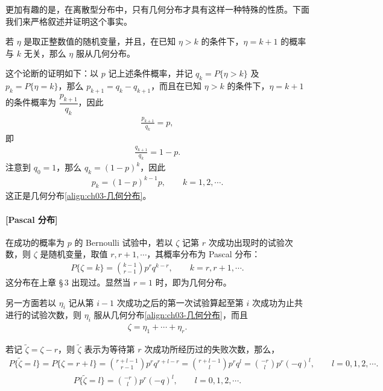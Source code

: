 \documentclass[../../main.tex]{subfiles}
\begin{document}
更加有趣的是，在离散型分布中，只有几何分布才具有这样一种特殊的性质。下面我们来严格叙述并证明这个事实。

若 $\eta$ 是取正整数值的随机变量，并且，在已知 $\eta>k$ 的条件下，$\eta=k+1$ 的概率与 $k$ 无关，那么 $\eta$ 服从几何分布。

这个论断的证明如下：以 $p$ 记上述条件概率，并记 $q_k=P\{\eta>k\}$ 及 $p_k=P\{\eta=k\}$，那么 $p_{k+1}=q_k-q_{k+1}$，而且在已知 $\eta>k$ 的条件下，$\eta=k+1$ 的条件概率为 $\dfrac{p_{k+1}}{q_k}$，因此
\begin{align*}\frac{p_{k+1}}{q_k}=p,\end{align*}
即
\begin{align*}\frac{q_{k+1}}{q_k}=1-p.\end{align*}
注意到 $q_0=1$，那么 $q_k=(1-p)^{k}$，因此
\begin{align*}p_k=(1-p)^{k-1}p,\qquad k=1,2,\cdots.\end{align*}
这正是几何分布\eqref{align:ch03-几何分布}。

\paragraph{[Pascal 分布]}在成功的概率为 $p$ 的 Bernoulli 试验中，若以 $\zeta$ 记第 $r$ 次成功出现时的试验次数，则 $\zeta$ 是随机变量，取值 $r,r+1,\cdots$，其概率分布为 Pascal 分布：
\begin{align}
P\{\zeta=k\}=\binom{k-1}{r-1}p^{r}q^{k-r},\qquad k=r,r+1,\cdots.\label{align:ch03-pascal分布}
\end{align}
这分布在上章 \S\,3 出现过。显然当 $r=1$ 时，即为几何分布。

另一方面若以 $\eta_i$ 记从第 $i-1$ 次成功之后的第一次试验算起至第 $i$ 次成功为止共进行的试验次数，则 $\eta_i$ 服从几何分布\eqref{align:ch03-几何分布}，而且
\begin{align}
\zeta=\eta_1+\cdots+\eta_r.\label{align:ch03-pascal分解}
\end{align}

若记 $\tilde{\zeta}=\zeta-r$，则 $\tilde{\zeta}$ 表示为等待第 $r$ 次成功所经历过的失败次数，那么，
\begin{align*}
P\{\tilde{\zeta}=l\}=P\{\zeta=r+l\}=\binom{r+l-1}{r-1}p^{r}q^{r+l-r}
=\binom{r+l-1}{l}p^{r}q^{l}=\binom{-r}{l}p^{r}(-q)^{l},\qquad l=0,1,2,\cdots.
\end{align*}
\begin{align}\label{align:ch03-pascal失败次数}
P\{\tilde{\zeta}=l\}=\binom{-r}{l}p^{r}(-q)^{l},\qquad l=0,1,2,\cdots.
\end{align}
\end{document}

